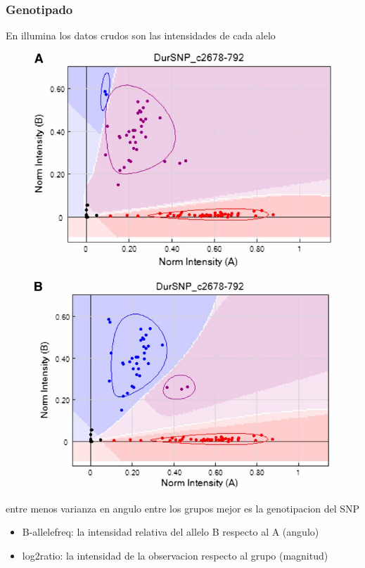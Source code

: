 \documentclass{beamer}\usepackage[]{graphicx}\usepackage[]{color}
\begin{document}
\begin{frame}[fragile]
\frametitle{Genotipado}
En illumina los datos crudos son las intensidades de cada alelo

\begin{figure}[htbp]
\begin{center}
\includegraphics[width=.5\linewidth]{clustermicro.jpg}
\end{center}
\end{figure}

entre menos varianza en angulo entre los grupos mejor es la genotipacion del SNP

\begin{itemize}
\item B-allelefreq: la intensidad relativa del allelo B respecto al A (angulo)
\item log2ratio: la intensidad de la observacion respecto al grupo (magnitud)
\end{itemize}

\end{frame}
\end{document}
